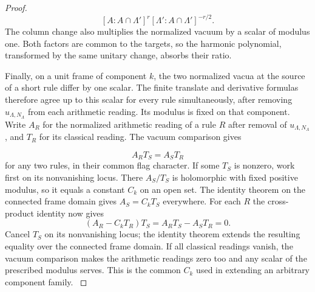 \begin{proof}
\[
  [A:A\cap\Lambda']^r[\Lambda':A\cap\Lambda']^{-r/2}.
\]
The column change also multiplies the normalized vacuum by
a scalar of modulus one. Both factors are common to the targets,
so the harmonic polynomial, transformed by the same unitary
change, absorbs their ratio.
\label{cor:slice-marked-theta-cover-2}

Finally, on a unit frame of component \(k\), the two normalized
vacua at the source of a short rule differ by one scalar. The
finite translate and derivative formulas therefore agree up to
this scalar for every rule simultaneously, after removing
\(u_{\Lambda,N_\Lambda}\) from each arithmetic reading. Its
modulus is fixed on that component. Write \(A_R\) for the normalized arithmetic reading of
a rule \(R\) after removal of \(u_{\Lambda,N_\Lambda}\), and
\(T_R\) for its classical reading. The vacuum comparison gives

\[
  A_R T_S=A_S T_R
\]
 for any two rules, in their common flag
character. If some \(T_S\) is nonzero, work first on its
nonvanishing locus. There \(A_S/T_S\) is holomorphic with fixed
positive modulus, so it equals a constant \(C_k\) on an open
set. The identity theorem on the connected frame domain gives
\(A_S=C_kT_S\) everywhere. For each \(R\) the cross-product identity now gives
\[
 (A_R-C_kT_R)T_S=A_R T_S-A_S T_R=0 .
\]
Cancel \(T_S\) on its nonvanishing locus; the identity theorem extends
the resulting equality over the connected frame domain. If all classical readings vanish, the vacuum
comparison makes the arithmetic readings zero too and any
scalar of the prescribed modulus serves. This is the common
\(C_k\) used in extending an arbitrary component family.
\label{cor:slice-marked-theta-cover-3}
\end{proof}
